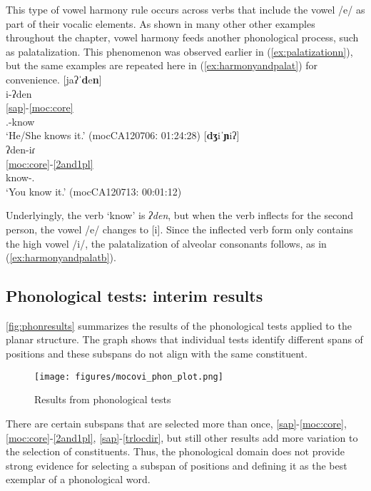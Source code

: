 \documentclass[output=paper]{langscibook}
\begin{document}
This type of vowel harmony rule occurs across verbs that include the vowel /e/ as part of their vocalic elements. As shown in many other other examples throughout the chapter, vowel harmony feeds another phonological process, such as palatalization. This phenomenon was observed earlier in (\ref{ex:palatizationn}), but the same examples are repeated here in (\ref{ex:harmonyandpalat}) for convenience. 
\ea\label{ex:harmonyandpalat}
\ea\label{ex:harmonyandpalata}
[jaʔˈ\textbf{d}e\textbf{n}]\\
\glll    i-ʔden  \\
    \ref{sap}-\ref{moc:core}\\
      {\Third.\II}-know\\
\glt `He/She knows it.'  \hfill (mocCA120706ː 01ː24ː28)
\ex\label{ex:harmonyandpalatb}
 [\textbf{dʒ}iˈ\textbf{ɲ}iʔ] \\
\glll        ʔden-iɾ \\
    \ref{moc:core}-\ref{2and1pl}\\
      know-{\Second\Sg.\II}\\
\glt `You know it.'  \hfill (mocCA120713: 00:01:12)
\z
\z

Underlyingly, the verb `know' is \textit{ʔden}, but when the verb inflects for the second person, the vowel /e/ changes to [i]. Since the inflected verb form only contains the high vowel /i/, the palatalization of alveolar consonants follows, as in (\ref{ex:harmonyandpalatb}). 

\subsection{Phonological tests: interim results}
\autoref{fig:phonresults} summarizes the results of the phonological tests applied to the planar structure. The graph shows that individual tests identify different spans of positions and these subspans do not align with the same constituent. 

\begin{figure}
    \centering
   \texttt{[image: figures/mocovi\_phon\_plot.png]}
    \caption{Results from phonological tests}
    \label{fig:phonresults}
\end{figure}

There are certain subspans that are selected more than once, \ref{sap}-\ref{moc:core}, \ref{moc:core}-\ref{2and1pl}, \ref{sap}-\ref{trlocdir}, but still other results add more variation to the selection of constituents. Thus, the phonological domain does not provide strong evidence for selecting a subspan of positions and defining it as the best exemplar of a phonological word. 
\end{document}
